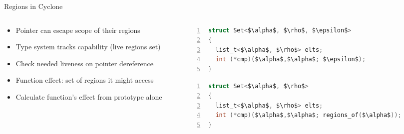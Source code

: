 \documentclass[aspectratio=169]{beamer}
\begin{document}
\begin{frame}[fragile]{Regions in Cyclone}
\footnotesize
  \begin{columns}[T]
    \begin{column}{0.52\textwidth}
      \begin{itemize}[<+->]
        \item Pointer can escape scope of their regions 
        \item Type system tracks \alert{capability} (live regions set)
        \item Check needed \alert{liveness} on pointer dereference %
        \item Function \alert{effect}: set of regions it might access
        \item Calculate function's effect from prototype alone
      \end{itemize}
    \end{column}

\begin{column}{0.46\textwidth}

    \pause

\begin{lstlisting}[language=C,numbers=left,mathescape,basicstyle={\footnotesize\ttfamily}]
struct Set<$\alpha$, $\rho$, $\epsilon$>
{
  list_t<$\alpha$, $\rho$> elts;
  int (*cmp)($\alpha$,$\alpha$; $\epsilon$);
}
\end{lstlisting}

\pause

\begin{lstlisting}[language=C,numbers=left,mathescape,basicstyle={\footnotesize\ttfamily}]
struct Set<$\alpha$, $\rho$>
{
  list_t<$\alpha$, $\rho$> elts;
  int (*cmp)($\alpha$,$\alpha$; regions_of($\alpha$));
}
\end{lstlisting}

\end{column}
\end{columns}

\end{frame}
\end{document}
